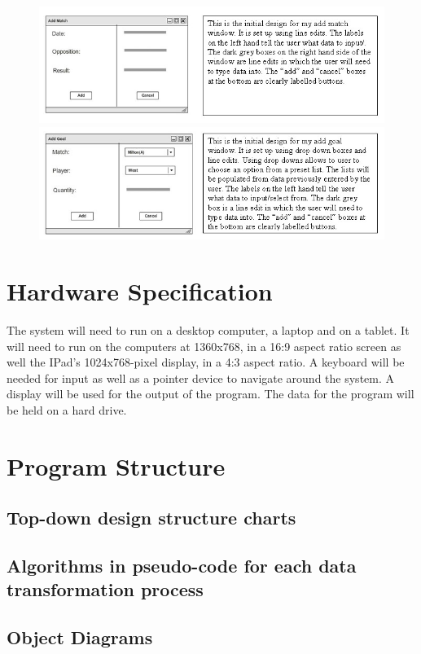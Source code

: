 \begin{figure}[H]
	\includegraphics{addMatchUifTxt}
	\includegraphics{addGoalUifTxt}
\end{figure}
\section{Hardware Specification}
The system will need to run on a desktop computer, a laptop and on a tablet. It will need to run on the computers at 1360x768, in a 16:9 aspect ratio screen as well the IPad's 1024x768-pixel display, in a 4:3 aspect ratio. A keyboard will be needed for input as well as a pointer device to navigate around the system. A display will be used for the output of the program. The data for the program will be held on a hard drive.
\section{Program Structure}

\subsection{Top-down design structure charts}

\subsection{Algorithms in pseudo-code for each data transformation process}

\subsection{Object Diagrams}

